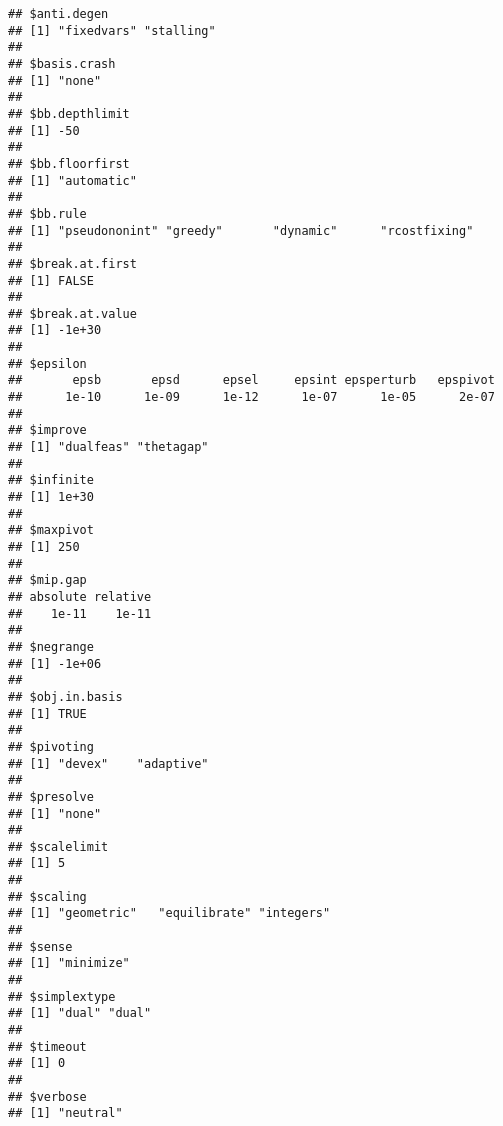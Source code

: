 \documentclass[
]{article}
\begin{document}
\begin{verbatim}
## $anti.degen
## [1] "fixedvars" "stalling" 
## 
## $basis.crash
## [1] "none"
## 
## $bb.depthlimit
## [1] -50
## 
## $bb.floorfirst
## [1] "automatic"
## 
## $bb.rule
## [1] "pseudononint" "greedy"       "dynamic"      "rcostfixing" 
## 
## $break.at.first
## [1] FALSE
## 
## $break.at.value
## [1] -1e+30
## 
## $epsilon
##       epsb       epsd      epsel     epsint epsperturb   epspivot 
##      1e-10      1e-09      1e-12      1e-07      1e-05      2e-07 
## 
## $improve
## [1] "dualfeas" "thetagap"
## 
## $infinite
## [1] 1e+30
## 
## $maxpivot
## [1] 250
## 
## $mip.gap
## absolute relative 
##    1e-11    1e-11 
## 
## $negrange
## [1] -1e+06
## 
## $obj.in.basis
## [1] TRUE
## 
## $pivoting
## [1] "devex"    "adaptive"
## 
## $presolve
## [1] "none"
## 
## $scalelimit
## [1] 5
## 
## $scaling
## [1] "geometric"   "equilibrate" "integers"   
## 
## $sense
## [1] "minimize"
## 
## $simplextype
## [1] "dual" "dual"
## 
## $timeout
## [1] 0
## 
## $verbose
## [1] "neutral"
\end{verbatim}
\end{document}
